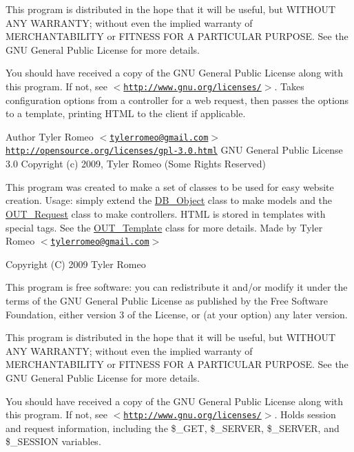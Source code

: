 This program is distributed in the hope that it will be useful, but WITHOUT ANY WARRANTY; without even the implied warranty of MERCHANTABILITY or FITNESS FOR A PARTICULAR PURPOSE. See the GNU General Public License for more details.

You should have received a copy of the GNU General Public License along with this program. If not, see $<$\href{http://www.gnu.org/licenses/}{\tt http://www.gnu.org/licenses/}$>$. Takes configuration options from a controller for a web request, then passes the options to a template, printing HTML to the client if applicable.

\begin{DoxyAuthor}{Author}
Tyler Romeo $<$\href{mailto:tylerromeo@gmail.com}{\tt tylerromeo@gmail.com}$>$  \href{http://opensource.org/licenses/gpl-3.0.html}{\tt http://opensource.org/licenses/gpl-\/3.0.html} GNU General Public License 3.0  Copyright (c) 2009, Tyler Romeo (Some Rights Reserved)
\end{DoxyAuthor}
This program was created to make a set of classes to be used for easy website creation. Usage: simply extend the \hyperlink{classDB__Object}{DB\_\-Object} class to make models and the \hyperlink{classOUT__Request}{OUT\_\-Request} class to make controllers. HTML is stored in templates with special tags. See the \hyperlink{classOUT__Template}{OUT\_\-Template} class for more details. Made by Tyler Romeo $<$\href{mailto:tylerromeo@gmail.com}{\tt tylerromeo@gmail.com}$>$

Copyright (C) 2009 Tyler Romeo

This program is free software: you can redistribute it and/or modify it under the terms of the GNU General Public License as published by the Free Software Foundation, either version 3 of the License, or (at your option) any later version.

This program is distributed in the hope that it will be useful, but WITHOUT ANY WARRANTY; without even the implied warranty of MERCHANTABILITY or FITNESS FOR A PARTICULAR PURPOSE. See the GNU General Public License for more details.

You should have received a copy of the GNU General Public License along with this program. If not, see $<$\href{http://www.gnu.org/licenses/}{\tt http://www.gnu.org/licenses/}$>$. Holds session and request information, including the \$\_\-GET, \$\_\-SERVER, \$\_\-SERVER, and \$\_\-SESSION variables.

